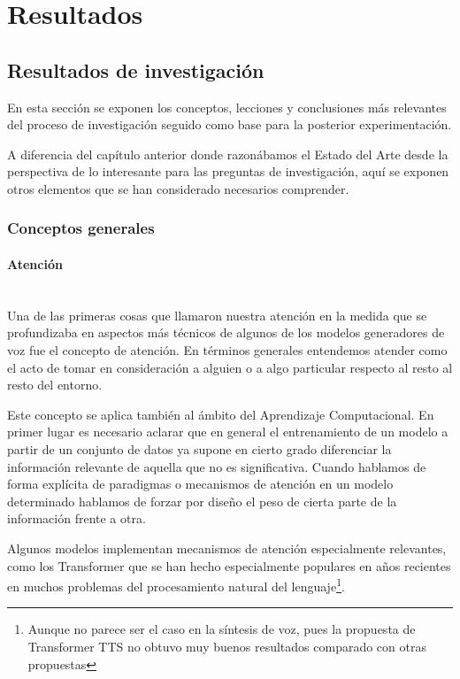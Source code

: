 \section{Resultados}

\subsection{Resultados de investigación}

En esta sección se exponen los conceptos, lecciones y conclusiones más relevantes del proceso de investigación seguido como base para la posterior experimentación.

A diferencia del capítulo anterior donde razonábamos el Estado del Arte desde la perspectiva de lo interesante para las preguntas de investigación, aquí se exponen otros elementos que se han considerado necesarios comprender.

\subsubsection{Conceptos generales}

\paragraph{Atención} ~\\

Una de las primeras cosas que llamaron nuestra atención en la medida que se profundizaba en aspectos más técnicos de algunos de los modelos generadores de voz fue el concepto de atención. En términos generales entendemos atender como el acto de tomar en consideración a alguien o a algo particular respecto al resto al resto del entorno. 

Este concepto se aplica también al ámbito del Aprendizaje Computacional. En primer lugar es necesario aclarar que en general el entrenamiento de un modelo a partir de un conjunto de datos ya supone en cierto grado diferenciar la información relevante de aquella que no es significativa. Cuando hablamos de forma explícita de paradigmas o mecanismos de atención en un modelo determinado hablamos de forzar por diseño el peso de cierta parte de la información frente a otra.

Algunos modelos implementan mecanismos de atención especialmente relevantes, como los Transformer que se han hecho especialmente populares en años recientes en muchos problemas del procesamiento natural del lenguaje\footnote{Aunque no parece ser el caso en la síntesis de voz, pues la propuesta de Transformer TTS no obtuvo muy buenos resultados comparado con otras propuestas}.

